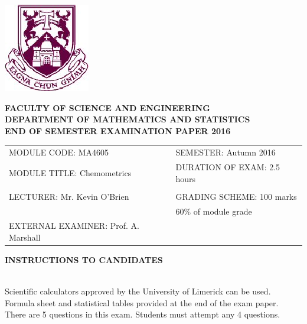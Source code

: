 \documentclass[a4paper,12pt]{article}
\begin{document}
	\begin{center}
		\includegraphics[scale=0.55]{images/shieldtransparent2}
	\end{center}
	
	\begin{center}
		\vspace{1cm}
		\large \bf {FACULTY OF SCIENCE AND ENGINEERING} \\[0.5cm]
		\normalsize DEPARTMENT OF MATHEMATICS AND STATISTICS \\[1.25cm]
		\large \bf {END OF SEMESTER EXAMINATION PAPER 2016} \\[1.5cm]
	\end{center}
	
	\begin{tabular}{ll}
		MODULE CODE: MA4605 & SEMESTER: Autumn 2016 \\[1cm]
		MODULE TITLE: Chemometrics & DURATION OF EXAM: 2.5 hours  \\
		 & \\ [1cm]
		LECTURER: Mr. Kevin O'Brien & GRADING SCHEME: 100 marks \\
		& \phantom{GRADING SCHEME:} \footnotesize {60\% of module grade} \\[1cm]
EXTERNAL EXAMINER: Prof. A. Marshall & \\
	\end{tabular}
\vspace{0.3cm}
	\begin{center}
		{\bf INSTRUCTIONS TO CANDIDATES}
	\end{center}
	
	{\noindent \\ Scientific calculators approved by the University of Limerick can be used. \\
		Formula sheet and statistical tables provided at the end of the exam paper.\\
		There are 5 questions in this exam. Students must attempt any 4 questions.}
	\newpage
\bigskip
\end{document}
